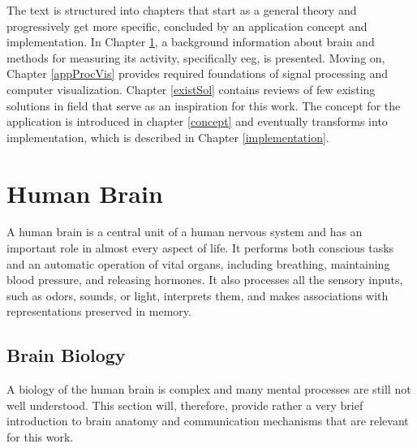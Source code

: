 The text is structured into chapters that start as a general theory and
progressively get more specific, concluded by an application concept and
implementation. In Chapter \ref{humanBrain}, a background information about brain
and methods for measuring its activity, specifically \gls{eeg}, is presented. Moving
on, Chapter \ref{appProcVis} provides required foundations of signal processing
and computer visualization. Chapter \ref{existSol} contains reviews of few existing
solutions in field that serve as an inspiration for this work. The concept for the application is
introduced in chapter \ref{concept} and eventually transforms into
implementation, which is described in Chapter \ref{implementation}.
 
\chapter{Human Brain} \label{humanBrain}
A human brain is a central unit of a human nervous system and has an important role in almost
every aspect of life. It performs both conscious tasks and an automatic operation
of vital organs, including breathing, maintaining blood pressure, and releasing
hormones. It also processes all the sensory inputs, such as odors, sounds, or light,
interprets them, and makes associations with representations preserved in memory.
\section{Brain Biology}
A biology of the human brain is complex and many mental processes are still not well understood. This section will, therefore, provide rather a very brief introduction to brain anatomy and communication mechanisms that are relevant for this work.

